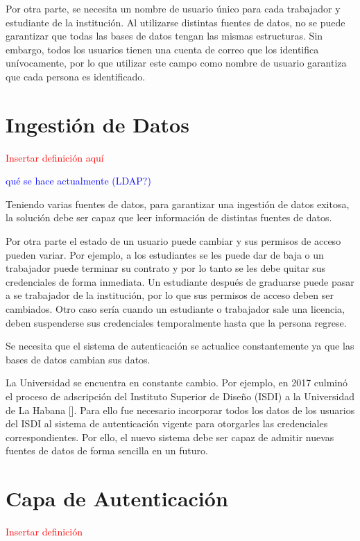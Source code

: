 Por otra parte, se necesita un nombre de usuario único para cada trabajador y estudiante de la institución. Al utilizarse distintas fuentes de datos, no se puede garantizar que todas las bases de datos tengan las mismas estructuras. Sin embargo, todos los usuarios tienen una cuenta de correo que los identifica unívocamente, por lo que utilizar este campo como nombre de usuario garantiza que cada persona es identificado.

\section*{Ingestión de Datos}

\textcolor{red}{Insertar definición aquí}

\textcolor{blue}{qué se hace actualmente (LDAP?)}

Teniendo varias fuentes de datos, para garantizar una ingestión de datos exitosa, la solución debe ser capaz que leer información de distintas fuentes de datos. 

Por otra parte el estado de un usuario puede cambiar y sus permisos de acceso pueden variar. Por ejemplo, a los estudiantes se les puede dar de baja o un trabajador puede terminar su contrato y por lo tanto se les debe quitar sus credenciales de forma inmediata. Un estudiante después de graduarse puede pasar a se trabajador de la institución, por lo que sus permisos de acceso deben ser cambiados. Otro caso sería cuando un estudiante o trabajador sale una licencia, deben suspenderse sus credenciales temporalmente hasta que la persona regrese. 

Se necesita que el sistema de autenticación se actualice constantemente ya que las bases de datos cambian sus datos.

La Universidad  se encuentra en constante cambio. Por ejemplo, en 2017 culminó el proceso de adscripción del Instituto Superior de Diseño (ISDI) a la Universidad de La Habana [\cite{isdi-historia}]. Para ello fue necesario incorporar todos los datos de los usuarios del ISDI al sistema de autenticación vigente para otorgarles las credenciales correspondientes. Por ello, el nuevo sistema debe ser capaz de admitir nuevas fuentes de datos de forma sencilla en un futuro. 

\section*{Capa de Autenticación}

\textcolor{red}{Insertar definición}

